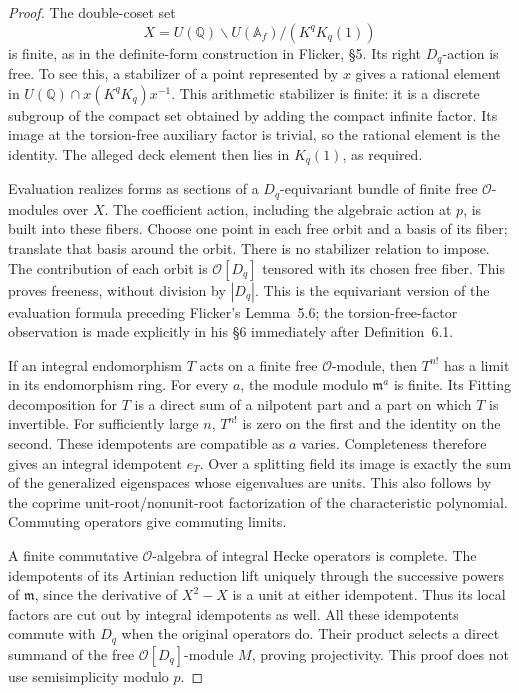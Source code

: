 \begin{proof}
The double-coset set
\[
 X=U(\mathbb Q)\backslash U(\mathbb A_f)/(K^qK_q(1))
 \tag{G72.3}
\]
is finite, as in the definite-form construction in Flicker,
\S5.  Its right \(D_q\)-action is free.  To see this, a
stabilizer of a point represented by \(x\) gives a rational
element in \(U(\mathbb Q)\cap x(K^qK_q)x^{-1}\).
This arithmetic stabilizer is finite: it is a discrete subgroup
of the compact set obtained by adding the compact infinite factor.
Its image at the torsion-free auxiliary factor is trivial, so
the rational element is the identity.  The alleged deck element
then lies in \(K_q(1)\), as required.

Evaluation realizes forms as sections of a \(D_q\)-equivariant
bundle of finite free \(\mathcal O\)-modules over \(X\).
The coefficient action, including the algebraic action at \(p\),
is built into these fibers.  Choose one point in each free orbit
and a basis of its fiber; translate that basis around the orbit.
There is no stabilizer relation to impose.  The contribution of
each orbit is \(\mathcal O[D_q]\) tensored with its chosen free
fiber.  This proves freeness, without division by \(|D_q|\).
This is the equivariant version of the evaluation formula preceding
Flicker's Lemma~5.6; the torsion-free-factor observation is made
explicitly in his \S6 immediately after Definition~6.1.

If an integral endomorphism \(T\) acts on a finite free
\(\mathcal O\)-module, then \(T^{n!}\) has a limit in its
endomorphism ring.  For every \(a\), the module modulo
\(\mathfrak m^a\) is finite.  Its Fitting decomposition for
\(T\) is a direct sum of a nilpotent part and a part on which
\(T\) is invertible.  For sufficiently large \(n\),
\(T^{n!}\) is zero on the first and the identity on the second.
These idempotents are compatible as \(a\) varies.  Completeness
therefore gives an integral idempotent \(e_T\).  Over a splitting
field its image is exactly the sum of the generalized eigenspaces
whose eigenvalues are units.  This also follows by the coprime
unit-root/nonunit-root factorization of the characteristic
polynomial.  Commuting operators give commuting limits.

A finite commutative \(\mathcal O\)-algebra of integral Hecke
operators is complete.  The idempotents of its Artinian reduction
lift uniquely through the successive powers of \(\mathfrak m\),
since the derivative of \(X^2-X\) is a unit at either idempotent.
Thus its local factors are cut out by integral idempotents as well.
All these idempotents commute with \(D_q\) when the original
operators do.  Their product selects a direct summand of the free
\(\mathcal O[D_q]\)-module \(M\), proving projectivity.
This proof does not use semisimplicity modulo \(p\).
\end{proof}

